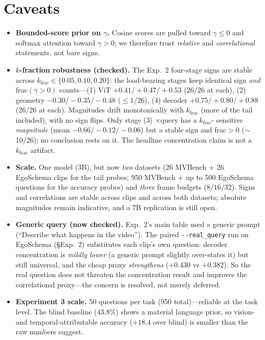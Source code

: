 \documentclass[11pt]{article}
\newcommand{\gm}{\gamma}
\begin{document}
\section{Caveats}
\begin{itemize}
\item \textbf{Bounded-score prior on $\gm$.} Cosine scores are pulled toward
      $\gm\le0$ and softmax attention toward $\gm>0$; we therefore trust
      \emph{relative} and \emph{correlational} statements, not bare signs.
\item \textbf{$k$-fraction robustness (checked).} The Exp.~2 four-stage signs are stable
      across $k_{\mathrm{frac}}\in\{0.05,0.10,0.20\}$: the load-bearing stages keep identical
      sign \emph{and} frac$(\gm{>}0)$ counts---(1) ViT $+0.41/+0.47/+0.53$ (26/26 at each),
      (2) geometry $-0.30/-0.35/-0.48$ ($\le$1/26), (4) decoder $+0.75/+0.80/+0.88$ (26/26 at
      each). Magnitudes drift monotonically with $k_{\mathrm{frac}}$ (more of the tail
      included), with no sign flips. Only stage (3) $\times$query has a $k_{\mathrm{frac}}$-
      sensitive \emph{magnitude} (mean $-0.66/-0.12/-0.06$) but a stable sign and frac$>0$
      ($\sim$10/26); no conclusion rests on it. The headline concentration claim is not a
      $k_{\mathrm{frac}}$ artifact.
\item \textbf{Scale.} One model (3B), but now \emph{two} datasets (26 MVBench $+$ 26
      EgoSchema clips for the tail probes; 950 MVBench $+$ up to 500 EgoSchema questions for
      the accuracy probes) and \emph{three} frame budgets ($8/16/32$). Signs and correlations
      are stable across clips and across both datasets; absolute magnitudes remain indicative,
      and a 7B replication is still open.
\item \textbf{Generic query (now checked).} Exp.~2's main table used a generic prompt
      (``Describe what happens in the video''). The paired \texttt{-{}-real\_query} run on
      EgoSchema (\S Exp.~2) substitutes each clip's own question: decoder concentration is
      \emph{mildly lower} (a generic prompt slightly over-states it) but still universal, and
      the cheap proxy \emph{strengthens} ($+0.430$ vs $+0.382$). So the real question does not
      threaten the concentration result and improves the correlational proxy---the concern is
      resolved, not merely deferred.
\item \textbf{Experiment 3 scale.} 50 questions per task (950 total)---reliable at the
      task level. The blind baseline ($43.8\%$) shows a material language prior, so
      vision- and temporal-attributable accuracy ($+18.4$ over blind) is smaller than
      the raw numbers suggest.
\end{itemize}
\end{document}
